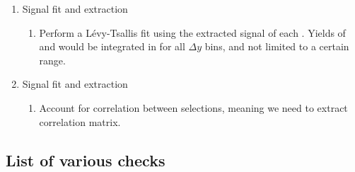\begin{enumerate}[label=\emph{\Alph*}.,font=\bfseries] \bfseries \slshape
    
    \item Signal fit and extraction     \label{Strat:SignalFit}
        \begin{enumerate}[label*=\roman*), leftmargin=0.5cm, topsep=0pt, itemsep=0pt, parsep=0pt, partopsep=0pt] \normalfont
            \item \label{Strat:SignalFit:LevyTsallis} Perform a Lévy-Tsallis fit using the extracted signal of each \pT. Yields of \rmOmega and \rmPhiMes would be integrated in \pT for all $\Delta y$ bins, and not limited to a certain range.                    
        \end{enumerate}        
        
    \item Signal fit and extraction     \label{Strat:SystStudy}
        \begin{enumerate}[label*=\roman*), leftmargin=0.5cm, topsep=0pt, itemsep=0pt, parsep=0pt, partopsep=0pt] \normalfont
            \item \label{Strat:SystStudy:CorrelatedSel} Account for correlation between selections, meaning we need to extract correlation matrix.                    
        \end{enumerate}    
  
\end{enumerate}

\subsection{List of various checks}
\label{sec:Section00.b-}


